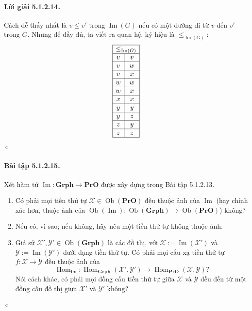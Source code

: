\paragraph{Lời giải 5.1.2.14.} Cách dễ thấy nhất là $v\leq v'$ trong $\operatorname{Im}(G)$ nếu có một đường đi từ $v$ đến $v'$ trong $G$. Nhưng để đầy đủ, ta viết ra quan hệ, ký hiệu là $\leq_{\operatorname{Im}(G)}$:
\[\begin{array}{|c|c|}\hline
\multicolumn{2}{|c|}{\leq_{\operatorname{Im}(G)}}\\\hline
v&v\\\hline v&w\\\hline v&x\\\hline w&w\\\hline w&x\\\hline x&x\\\hline y&y\\\hline y&z\\\hline z&y\\\hline z&z\\\hline
\end{array}\]\hfill$\diamond$
\paragraph{Bài tập 5.1.2.15.} Xét hàm tử $\operatorname{Im}:\mathbf{Grph}\to\mathbf{PrO}$ được xây dựng trong Bài tập 5.1.2.13.
\begin{enumerate}[label=\alph*.]
\item Có phải mọi tiền thứ tự $\mathcal X\in\operatorname{Ob}(\mathbf{PrO})$ đều thuộc ảnh của $\operatorname{Im}$ (hay chính xác hơn, thuộc ảnh của $\operatorname{Ob}(\operatorname{Im}):\operatorname{Ob}(\mathbf{Grph})\to\operatorname{Ob}(\mathbf{PrO})$) không?
\item Nếu có, vì sao; nếu không, hãy nêu một tiền thứ tự không thuộc ảnh.
\item Giả sử $\mathcal X',\mathcal Y'\in\operatorname{Ob}(\mathbf{Grph})$ là các đồ thị, với $\mathcal X:=\operatorname{Im}(\mathcal X')$ và $\mathcal Y:=\operatorname{Im}(\mathcal Y')$ dưới dạng tiền thứ tự. Có phải mọi cấu xạ tiền thứ tự $f:\mathcal X\to\mathcal Y$ đều thuộc ảnh của
\[\operatorname{Hom}_{\operatorname{Im}}:\operatorname{Hom}_{\mathbf{Grph}}(\mathcal X',\mathcal Y')\longrightarrow\operatorname{Hom}_{\mathbf{PrO}}(\mathcal X,\mathcal Y)?\]
Nói cách khác, có phải mọi đồng cấu tiền thứ tự giữa $\mathcal X$ và $\mathcal Y$ đều đến từ một đồng cấu đồ thị giữa $\mathcal X'$ và $\mathcal Y'$ không?
\end{enumerate}\hfill$\diamond$
